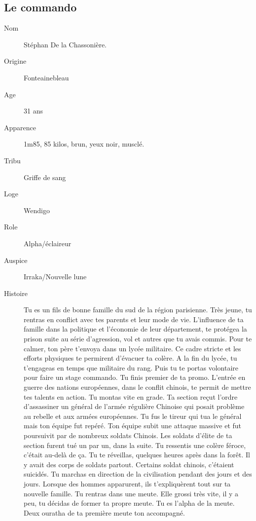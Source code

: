 \documentclass[oneside,12pt]{book}
\begin{document}
\begin{flushleft}
\subsection{Le commando}
\begin{description}
\item[Nom]{ Stéphan De la Chassonière.}
\item[Origine]{ Fonteainebleau}
\item[Age]{  31 ans}
\item[Apparence]{1m85, 85 kilos, brun, yeux noir, musclé.}
\item[Tribu]{Griffe de sang}
\item[Loge]{Wendigo}
\item[Role]{Alpha/éclaireur}
\item[Auspice]{Irraka/Nouvelle lune}
\item[Histoire]{Tu es un fils de bonne famille du sud de la région parisienne.
Très jeune, tu rentras en conflict avec tes parents et leur mode de vie. 
L'influence de ta famille dans la politique et l'économie de leur département, te protégea la prison suite au série d'agression, vol et autres que tu avais commis. 
Pour te calmer, ton père t'envoya dans un lycée militaire. 
Ce cadre stricte et les efforts physiques te permirent d'évacuer ta colère.
A la fin du lycée, tu t'engageas en temps que militaire du rang.
Puis tu te portas volontaire pour faire un stage commando.
Tu finis premier de ta promo. L'entrée en guerre des nations européennes, dans le conflit chinois, te permit de mettre tes talents en action.
Tu montas vite en grade. Ta section reçut l'ordre d'assassiner un général de l'armée régulière Chinoise qui posait problème au rebelle et aux armées européennes. 
Tu fus le tireur qui tua le général mais ton équipe fut repéré. 
Ton équipe subit une attaque massive et fut poursuivit par de nombreux soldats Chinois. 
Les soldats d'élite de ta section furent tué un par un, dans la suite. Tu ressentis une colère féroce, c'était au-delà de ça. 
Tu te réveillas, quelques heures après dans la forêt. 
Il y avait des corps de soldats partout. Certains soldat chinois, c'étaient suicidés. Tu marchas en direction de la civilisation pendant des jours et des jours. Lorsque des hommes apparurent, ils t'expliquèrent tout sur ta nouvelle famille. 
Tu rentras dans une meute. Elle grossi très vite, il y a peu, tu décidas de former ta propre meute. Tu es l'alpha de la meute. Deux ouratha de ta première meute ton accompagné. }
\end{description}
\clearpage



\end{flushleft}
\end{document}
